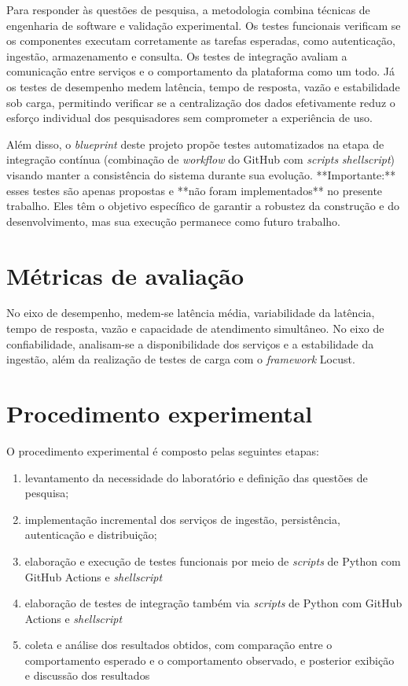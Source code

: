 Para responder às questões de pesquisa, a metodologia combina técnicas de engenharia de software e validação experimental. Os testes funcionais verificam se os componentes executam corretamente as tarefas esperadas, como autenticação, ingestão, armazenamento e consulta. Os testes de integração avaliam a comunicação entre serviços e o comportamento da plataforma como um todo. Já os testes de desempenho medem latência, tempo de resposta, vazão e estabilidade sob carga, permitindo verificar se a centralização dos dados efetivamente reduz o esforço individual dos pesquisadores sem comprometer a experiência de uso.

Além disso, o \textit{blueprint} deste projeto propõe testes automatizados na etapa de integração contínua (combinação de \textit{workflow} do GitHub com \textit{scripts} \textit{shellscript}) visando manter a consistência do sistema durante sua evolução. **Importante:** esses testes são apenas propostas e **não foram implementados** no presente trabalho. Eles têm o objetivo específico de garantir a robustez da construção e do desenvolvimento, mas sua execução permanece como futuro trabalho.

\section{Métricas de avaliação}

No eixo de desempenho, medem-se latência média, variabilidade da latência, tempo de resposta, vazão e capacidade de atendimento simultâneo. No eixo de confiabilidade, analisam-se a disponibilidade dos serviços e a estabilidade da ingestão, além da realização de testes de carga com o \textit{framework} Locust.

\section{Procedimento experimental}

O procedimento experimental é composto pelas seguintes etapas:
\begin{enumerate}
    \item levantamento da necessidade do laboratório e definição das questões de pesquisa;
    \item implementação incremental dos serviços de ingestão, persistência, autenticação e distribuição;
    \item elaboração e execução de testes funcionais por meio de \textit{scripts} de Python com GitHub Actions e \textit{shellscript}
    \item elaboração de testes de integração também via \textit{scripts} de Python com GitHub Actions e \textit{shellscript}
    \item coleta e análise dos resultados obtidos, com comparação entre o comportamento esperado e o comportamento observado, e posterior exibição e discussão dos resultados
\end{enumerate}

